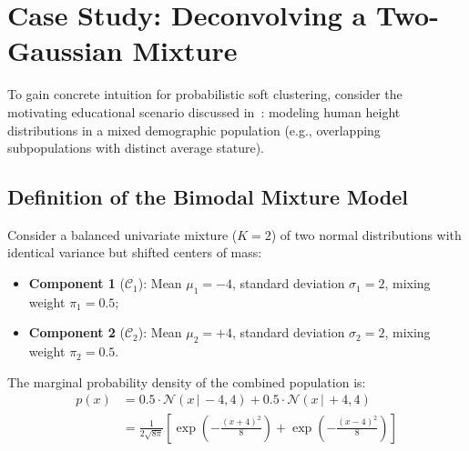 \section{Case Study: Deconvolving a Two-Gaussian Mixture}
\label{sec:dm-case-study-two-gaussians}

To gain concrete intuition for probabilistic soft clustering, consider the motivating educational scenario discussed in~\cite{tan2018}: modeling human height distributions in a mixed demographic population (e.g., overlapping subpopulations with distinct average stature).

\subsection{Definition of the Bimodal Mixture Model}

Consider a balanced univariate mixture ($K=2$) of two normal distributions with identical variance but shifted centers of mass:
\begin{itemize}
    \item \textbf{Component 1} ($\mathcal{C}_1$): Mean $\mu_1 = -4$, standard deviation $\sigma_1 = 2$, mixing weight $\pi_1 = 0.5$;
    \item \textbf{Component 2} ($\mathcal{C}_2$): Mean $\mu_2 = +4$, standard deviation $\sigma_2 = 2$, mixing weight $\pi_2 = 0.5$.
\end{itemize}
The marginal probability density of the combined population is:
\begin{align}
\label{eq:dm-two-gaussian-pdf}
p(x) &= 0.5 \cdot \mathcal{N}(x \,|\, -4, 4) + 0.5 \cdot \mathcal{N}(x \,|\, +4, 4) \nonumber \\
&= \frac{1}{2\sqrt{8\pi}} \left[ \exp\left( -\frac{(x+4)^2}{8} \right) + \exp\left( -\frac{(x-4)^2}{8} \right) \right]
\end{align}

